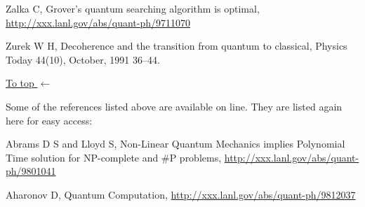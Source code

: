 \documentclass{article}
\def\pagedone{\newpage}
\def\tthdump#1{#1}
\begin{document}
\begin{thebibliography}{12}
Zalka C, 
Grover's quantum searching algorithm is optimal,
\hyperref{http://xxx.lanl.gov/abs/quant-ph/9711070}{}{}
{http://xxx.lanl.gov/abs/quant-ph/9711070}


 Zurek W H,  
Decoherence and the transition from quantum to classical, 
Physics Today 44(10), October, 1991 36--44. 





\end{thebibliography}

\tthdump{\hyperlink{Our general topics:}{\hfil To top $\leftarrow$}}

\pagedone



Some of the references listed above are available on line.  They are listed again here for easy access:

Abrams D S and Lloyd S, 
Non-Linear Quantum Mechanics implies Polynomial Time 
solution for NP-complete and $\#$P problems,
\hyperref{http://xxx.lanl.gov/abs/quant-ph/9801041}{}{}
{http://xxx.lanl.gov/abs/quant-ph/9801041}



Aharonov D, 
Quantum Computation,
\hyperref{http://xxx.lanl.gov/abs/quant-ph/9812037}{}{}
{http://xxx.lanl.gov/abs/quant-ph/9812037}
\end{document}
